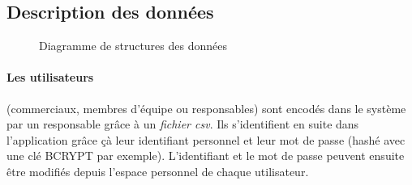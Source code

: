 \documentclass{article}[12pt]
\begin{document}
\subsection{Description des données}
\begin{figure}[H]
	\centering
	\caption{Diagramme de structures des données}
\end{figure}
\paragraph{Les utilisateurs} (commerciaux, membres d'équipe ou responsables) sont encodés dans le système par un responsable grâce à un \textit{fichier csv}. Ils s'identifient en suite dans l'application grâce çà leur identifiant personnel et leur mot de passe (hashé avec une clé BCRYPT par exemple). L'identifiant et le mot de passe peuvent ensuite être modifiés depuis l'espace personnel de chaque utilisateur.
\end{document}
